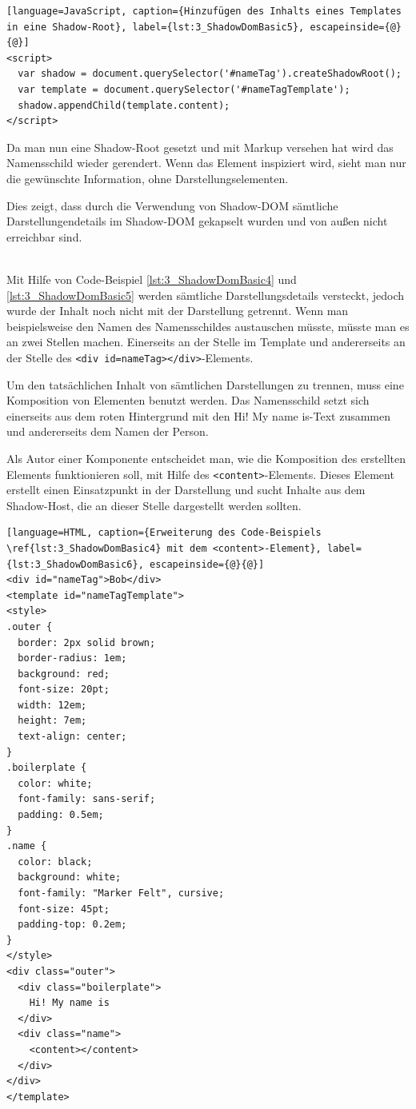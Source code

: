\begin{enumerate}
\begin{lstlisting}[language=JavaScript, caption={Hinzufügen des Inhalts eines Templates in eine Shadow-Root}, label={lst:3_ShadowDomBasic5}, escapeinside={@}{@}]
<script>
  var shadow = document.querySelector('#nameTag').createShadowRoot();
  var template = document.querySelector('#nameTagTemplate');
  shadow.appendChild(template.content);
</script>
\end{lstlisting}

Da man nun eine Shadow-Root gesetzt und mit Markup versehen hat wird das Namensschild wieder gerendert. Wenn das Element inspiziert wird, sieht man nur die gewünschte Information, ohne Darstellungselementen.

Dies zeigt, dass durch die Verwendung von Shadow-DOM sämtliche Darstellungendetails im Shadow-DOM gekapselt wurden und von außen nicht erreichbar sind.

 \hfill \\
Mit Hilfe von Code-Beispiel \ref{lst:3_ShadowDomBasic4} und \ref{lst:3_ShadowDomBasic5} werden sämtliche Darstellungsdetails versteckt, jedoch wurde der Inhalt noch nicht mit der Darstellung getrennt. Wenn man beispielsweise den Namen des Namensschildes austauschen müsste, müsste man es an zwei Stellen machen. Einerseits an der Stelle im Template und andererseits an der Stelle des \lstinline|<div id=nameTag></div>|-Elements.

Um den tatsächlichen Inhalt von sämtlichen Darstellungen zu trennen, muss eine Komposition von Elementen benutzt werden. Das Namensschild setzt sich einerseits aus dem roten Hintergrund mit den \glqq Hi! My name is\grqq -Text zusammen und andererseits dem Namen der Person.

Als Autor einer Komponente entscheidet man, wie die Komposition des erstellten Elements funktionieren soll, mit Hilfe des \lstinline|<content>|-Elements. Dieses Element erstellt einen Einsatzpunkt in der Darstellung und sucht Inhalte aus dem Shadow-Host, die an dieser Stelle dargestellt werden sollten.

\begin{lstlisting}[language=HTML, caption={Erweiterung des Code-Beispiels \ref{lst:3_ShadowDomBasic4} mit dem <content>-Element}, label={lst:3_ShadowDomBasic6}, escapeinside={@}{@}]
<div id="nameTag">Bob</div>
<template id="nameTagTemplate">
<style>
.outer {
  border: 2px solid brown;
  border-radius: 1em;
  background: red;
  font-size: 20pt;
  width: 12em;
  height: 7em;
  text-align: center;
}
.boilerplate {
  color: white;
  font-family: sans-serif;
  padding: 0.5em;
}
.name {
  color: black;
  background: white;
  font-family: "Marker Felt", cursive;
  font-size: 45pt;
  padding-top: 0.2em;
}
</style>
<div class="outer">
  <div class="boilerplate">
    Hi! My name is
  </div>
  <div class="name">
    <content></content>
  </div>
</div>
</template>
\end{lstlisting}


\end{enumerate}
